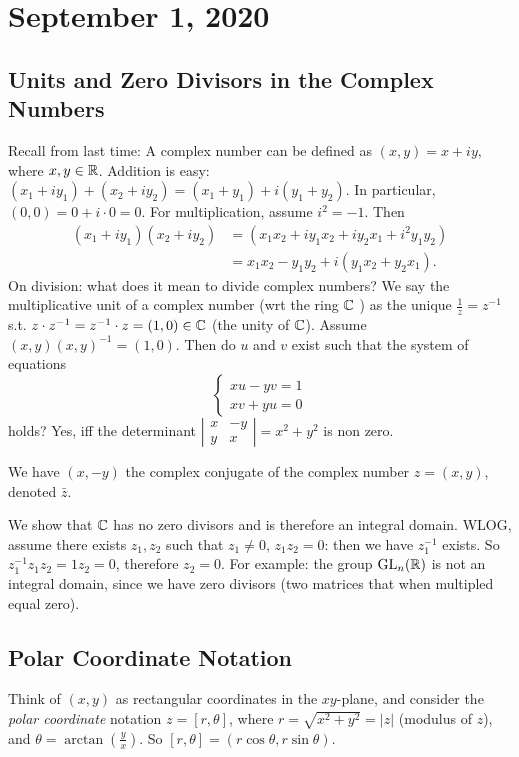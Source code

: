 \section{September 1, 2020}
\subsection{Units and Zero Divisors in the Complex Numbers}
Recall from last time: A complex number can be defined as $(x,y)=x+iy,$ where $x, y \in \mathbb{R}$. Addition is easy: $(x_1+iy_1)+(x_2+iy_2)=(x_1+y_1)+i(y_1+y_2)$. In particular, $(0,0)=0+i\cdot 0=0$. For multiplication, assume $i^2=-1.$ Then 
\begin{align*}
    (x_1+iy_1)(x_2+iy_2)&=(x_1x_2+iy_1x_2+iy_2x_1+i^2y_1y_2)\\
                        &=x_1x_2-y_1y_2+i(y_1x_2+y_2x_1).
\end{align*}
On division: what does it mean to divide complex numbers? We say the multiplicative unit of a complex number (wrt the ring $\mathbb{C}$ ) as the unique $\frac{1}{z}=z^{-1}$ s.t. $z\cdot z^{-1}=z^{-1}\cdot z=(1,0) \in \mathbb{C}$ (the unity of $\mathbb{C}$). Assume $(x,y)(x,y)^{-1}=(1,0)$.  Then do $u$ and $v$ exist such that the system of equations
\begin{equation*}
    \begin{cases}
    xu-yv=1 \\
    xv+yu=0
    \end{cases}
\end{equation*}
holds? Yes, iff the determinant $\left| \begin{smallmatrix} x & -y \\ y & x\end{smallmatrix} \right| =x^2+y^2$ is non zero.

\begin{definition}
    We have $(x, -y)$ the complex conjugate of the complex number $z=(x,y)$, denoted $\bar{z}$.
\end{definition}

We show that  $\mathbb{C}$ has no zero divisors and is therefore an integral domain. WLOG, assume there exists $z_1,z_2$ such that $z_1 \neq 0, \, z_1z_2=0$: then we have $z_1^{-1}$ exists. So $z_1^{-1}z_1z_2=1z_2=0$, therefore $z_2=0.$ For example: the group $\operatorname{GL}_n(\mathbb{R})$ is not an integral domain, since we have zero divisors (two matrices that when multipled equal zero).

\subsection{Polar Coordinate Notation}
\begin{definition}
Think of $(x,y)$ as rectangular coordinates in the $xy$-plane, and consider the \emph{polar coordinate} notation $z=[r,\theta]$, where $r=\sqrt{x^2+y^2} = |z|$ (modulus of $z$), and $\theta = \arctan (\frac{y}{x}).$ So $[r,\theta]=(r \cos \theta, r \sin \theta)$.
\end{definition}

